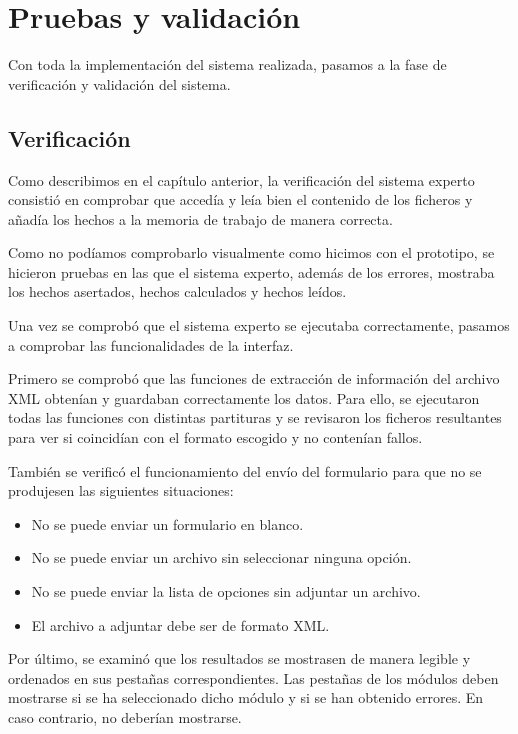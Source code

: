 \chapter{Pruebas y validación}

Con toda la implementación del sistema realizada, pasamos a la fase de verificación y validación del sistema. 

\section{Verificación}

Como describimos en el capítulo anterior, la verificación del sistema experto consistió en comprobar que accedía y leía bien el contenido de los ficheros y añadía los hechos a la memoria de trabajo de manera correcta. 

Como no podíamos comprobarlo visualmente como hicimos con el prototipo, se hicieron pruebas en las que el sistema experto, además de los errores, mostraba los hechos asertados, hechos calculados y hechos leídos. 

Una vez se comprobó que el sistema experto se ejecutaba correctamente, pasamos a comprobar las funcionalidades de la interfaz.

Primero se comprobó que las funciones de extracción de información del archivo XML obtenían y guardaban correctamente los datos. Para ello, se ejecutaron todas las funciones con distintas partituras y se revisaron los ficheros resultantes para ver si coincidían con el formato escogido y no contenían fallos.

También se verificó el funcionamiento del envío del formulario para que no se produjesen las siguientes situaciones:

\begin{itemize}

	\item No se puede enviar un formulario en blanco.
	\item No se puede enviar un archivo sin seleccionar ninguna opción.
	\item No se puede enviar la lista de opciones sin adjuntar un archivo.
	\item El archivo a adjuntar debe ser de formato XML.

\end{itemize}

Por último, se examinó que los resultados se mostrasen de manera legible y ordenados en sus pestañas correspondientes. Las pestañas de los módulos deben mostrarse si se ha seleccionado dicho módulo y si se han obtenido errores. En caso contrario, no deberían mostrarse.

